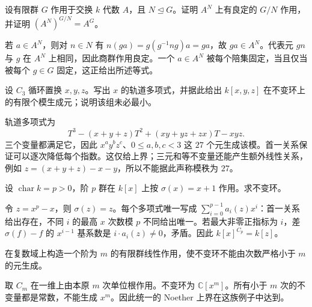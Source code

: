 \begin{optionalexercise}\label{b5:ex:22-normal-invariants}
	设有限群 \(G\) 作用于交换 \(k\) 代数 \(A\)，且 \(N\trianglelefteq G\)。证明 \(A^N\) 上有良定的 \(G/N\) 作用，并证明 \((A^N)^{G/N}=A^G\)。
\end{optionalexercise}
\begin{solution}
	若 \(a\in A^N\)，则对 \(n\in N\) 有 \(n(ga)=g(g^{-1}ng)a=ga\)，故 \(ga\in A^N\)。代表元 \(gn\) 与 \(g\) 在 \(A^N\) 上相同，因此商群作用良定。一个 \(a\in A^N\) 被每个陪集固定，当且仅当被每个 \(g\in G\) 固定，这正给出所述等式。
\end{solution}

\begin{optionalexercise}\label{b5:ex:22-orbit-polynomial}
	设 \(C_3\) 循环置换 \(x,y,z\)。写出 \(x\) 的轨道多项式，并据此给出 \(k[x,y,z]\) 在不变环上的有限个模生成元；说明该组未必最小。
\end{optionalexercise}
\begin{solution}
	轨道多项式为
	\[
		T^3-(x+y+z)T^2+(xy+yz+zx)T-xyz.
	\]
	三个变量都满足它，因此 \(x^ay^bz^c\)、\(0\le a,b,c<3\) 这 \(27\) 个元生成该模。首一关系保证可以逐次降低每个指数。这仅给上界；三元和等不变量还能产生额外线性关系，例如 \(z=(x+y+z)-x-y\)，所以不能据此声称模秩为 \(27\)。
\end{solution}

\begin{optionalexercise}\label{b5:ex:22-modular-affine}
	设 \(\operatorname{char}k=p>0\)，阶 \(p\) 群在 \(k[x]\) 上按 \(\sigma(x)=x+1\) 作用。求不变环。
\end{optionalexercise}
\begin{solution}
	令 \(z=x^p-x\)，则 \(\sigma(z)=z\)。每个多项式唯一写成 \(\sum_{i=0}^{p-1}a_i(z)x^i\)：首一关系给出存在，不同 \(i\) 的最高 \(x\) 次数模 \(p\) 不同给出唯一。若最大非零正指标为 \(i\)，差 \(\sigma(f)-f\) 的 \(x^{i-1}\) 基系数是 \(i\cdot a_i(z)\ne0\)，矛盾。因此 \(k[x]^{C_p}=k[z]\)。
\end{solution}

\begin{optionalexercise}\label{b5:ex:22-noether-sharp}
	在复数域上构造一个阶为 \(m\) 的有限群线性作用，使不变环不能由次数严格小于 \(m\) 的元生成。
\end{optionalexercise}
\begin{solution}
	取 \(C_m\) 在一维上由本原 \(m\) 次单位根作用。不变环为 \(\mathbb C[x^m]\)。所有小于 \(m\) 次的不变量都是常数，不能生成 \(x^m\)。因此统一的 Noether 上界在这族例子中达到。
\end{solution}

